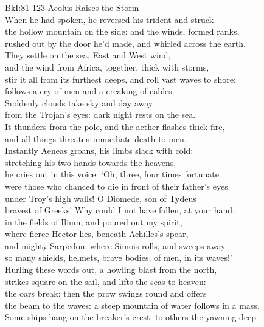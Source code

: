 \documentclass[12pt, a5paper, titlepage]{letter}
\begin{document}
{BkI:81-123 Aeolus Raises the Storm}\\
When he had spoken, he reversed his trident and struck\\
the hollow mountain on the side: and the winds, formed ranks,\\
rushed out by the door he'd made, and whirled across the earth.\\
They settle on the sea, East and West wind,\\
and the wind from Africa, together, thick with storms,\\
stir it all from its furthest deeps, and roll vast waves to shore:\\
follows a cry of men and a creaking of cables.\\
Suddenly clouds take sky and day away\\
from the Trojan's eyes: dark night rests on the sea.\\
It thunders from the pole, and the aether flashes thick fire,\\
and all things threaten immediate death to men.\\
Instantly Aeneas groans, his limbs slack with cold:\\
stretching his two hands towards the heavens,\\
he cries out in this voice: `Oh, three, four times fortunate\\
were those who chanced to die in front of their father's eyes\\
under Troy's high walls! O Diomede, son of Tydeus\\
bravest of Greeks! Why could I not have fallen, at your hand,\\
in the fields of Ilium, and poured out my spirit,\\
where fierce Hector lies, beneath Achilles's spear,\\
and mighty Sarpedon: where Simois rolls, and sweeps away\\
so many shields, helmets, brave bodies, of men, in its waves!'\\
Hurling these words out, a howling blast from the north,\\
strikes square on the sail, and lifts the seas to heaven:\\
the oars break: then the prow swings round and offers\\
the beam to the waves: a steep mountain of water follows in a mass.\\
Some ships hang on the breaker's crest: to others the yawning deep\\
\end{document}
